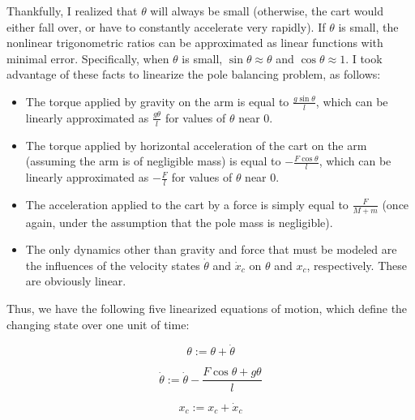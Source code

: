\documentclass[12pt]{article}
\begin{document}
Thankfully, I realized that $\theta$ will always be small (otherwise, the cart would either fall over, or have to constantly accelerate very rapidly). If $\theta$ is small, the nonlinear trigonometric ratios can be approximated as linear functions with minimal error. Specifically, when $\theta$ is small, $\sin \theta \approx \theta$ and $\cos \theta \approx 1$. I took advantage of these facts to linearize the pole balancing problem, as follows:

\begin{itemize}
    \item The torque applied by gravity on the arm is equal to $\displaystyle \frac{\displaystyle g \sin \theta}{\displaystyle l}$, which can be linearly approximated as $\displaystyle \frac{\displaystyle g \theta}{\displaystyle l}$ for values of $\theta$ near 0.
    \item The torque applied by horizontal acceleration of the cart on the arm (assuming the arm is of negligible mass) is equal to $\displaystyle - \frac{\displaystyle F \cos \theta}{\displaystyle l}$, which can be linearly approximated as $\displaystyle - \frac{\displaystyle F}{\displaystyle l}$ for values of $\theta$ near 0.
    \item The acceleration applied to the cart by a force is simply equal to $\displaystyle \frac{\displaystyle F}{\displaystyle M + m}$ (once again, under the assumption that the pole mass is negligible).
    \item The only dynamics other than gravity and force that must be modeled are the influences of the velocity states $\dot \theta$ and $\dot x _c$ on $\theta$ and $x _c$, respectively. These are obviously linear.
\end{itemize}

Thus, we have the following five linearized equations of motion, which define the changing state over one unit of time:

\begin{equation}
    \displaystyle \theta := \theta + \dot \theta
\end{equation}

\begin{equation}
    \displaystyle \dot \theta := \dot \theta - \frac{\displaystyle F \cos \theta + g \theta}{\displaystyle l}
\end{equation}

\begin{equation}
    \displaystyle x _c := x _c + \dot x _c
\end{equation}
\end{document}
